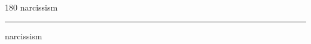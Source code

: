 
\begin{frame}
\begin{center}
\begin{turn}{180}
{\fontsize{2.5cm}{1em}\selectfont narcissism}
\end{turn}
\vspace{1em}\par  
\hrule
\vspace{1em}\par  
{\fontsize{2.5cm}{1em}\selectfont narcissism}
\end{center}
\end{frame}

